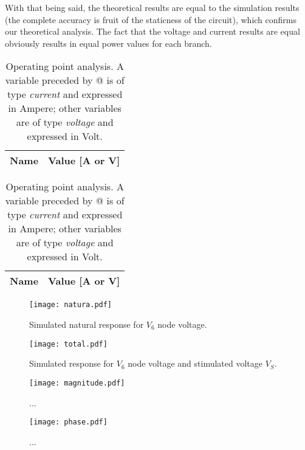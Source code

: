 With that being said, the theoretical results are equal to the simulation results (the complete accuracy is fruit of the staticness of the circuit), which confirms our theoretical analysis. The fact that the voltage and current results are equal obviously results in equal power values for each branch.

\begin{table}[h]
  \centering
  \begin{tabular}{|l|r|}
    \hline    
    {\bf Name} & {\bf Value [A or V]} \\ \hline
    
  \end{tabular}
  \caption{Operating point analysis. A variable preceded by @ is of type {\em current}
    and expressed in Ampere; other variables are of type {\it voltage} and expressed in
    Volt.}
  \label{tab:op}
\end{table}

\begin{table}[h]
  \centering
  \begin{tabular}{|l|r|}
    \hline    
    {\bf Name} & {\bf Value [A or V]} \\ \hline
    
  \end{tabular}
  \caption{Operating point analysis. A variable preceded by @ is of type {\em current}
    and expressed in Ampere; other variables are of type {\it voltage} and expressed in
    Volt.}
  \label{tab:op2}
\end{table}

\begin{figure}[h] \centering
\texttt{[image: natura.pdf]}
\caption{Simulated natural response for $V_{6}$ node voltage.}
\label{fig:natura}
\end{figure}

\begin{figure}[h] \centering
\texttt{[image: total.pdf]}
\caption{Simulated response for $V_{6}$ node voltage and stimulated voltage $V_{S}$.}
\label{fig:total}
\end{figure}

\begin{figure}[h] \centering
\texttt{[image: magnitude.pdf]}
\caption{...}
\label{fig:magnitude}
\end{figure}

\begin{figure}[h] \centering
\texttt{[image: phase.pdf]}
\caption{...}
\label{fig:phase}
\end{figure}
